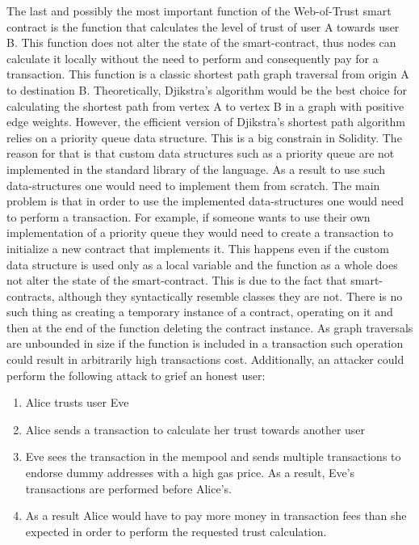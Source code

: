 {{{The last and possibly the most important function of the Web-of-Trust smart contract is the function that calculates the level of trust of user A towards user B. This function does not alter the state of the smart-contract, thus nodes can calculate it locally without the need to perform and consequently pay for a transaction. This function is a classic shortest path graph traversal from origin A to destination B. Theoretically, Djikstra's algorithm \cite{algos} would be the best choice for calculating the shortest path from vertex A to vertex B in a graph with positive edge weights. However, the efficient version of  Djikstra's shortest path algorithm relies on a priority queue data structure. This is a big constrain in Solidity. The reason for that is that custom data structures such as a priority queue are not implemented in the standard library of the language. As a result to use such data-structures one would need to implement them from scratch. The main problem is that in order to use the implemented data-structures one would need to perform a transaction. For example, if someone wants to use their own implementation of a priority queue they would need to create a transaction to initialize a new contract that implements it. This happens even if the custom data structure is used only as a local variable and the function as a whole does not alter the state of the smart-contract. This is due to the fact that smart-contracts, although they syntactically resemble classes they are not. There is no such thing as creating a temporary instance of a contract, operating on it and then at the end of the function deleting the contract instance. As graph traversals are unbounded in size if the function is included in a transaction such operation could result in arbitrarily high transactions cost. Additionally, an attacker could perform the following attack to grief an honest user:

\begin{enumerate}
\item Alice trusts user Eve
\item Alice sends a transaction to calculate her trust towards another user
\item Eve sees the transaction in the mempool and sends multiple transactions to endorse dummy addresses with a high gas price. As a result, Eve's transactions are performed before Alice's.
\item As a result Alice would have to pay more money in transaction fees than she expected in order to perform the requested trust calculation.
\end{enumerate}

}}}
